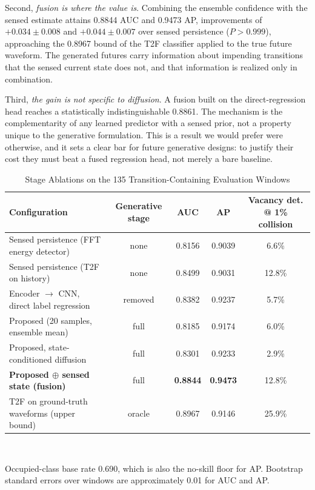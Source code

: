 \documentclass[lettersize,journal]{IEEEtran}
\begin{document}
Second, \emph{fusion is where the value is}. Combining the ensemble
confidence with the sensed estimate attains 0.8844 AUC and 0.9473 AP,
improvements of $+0.034 \pm 0.008$ and $+0.044 \pm 0.007$ over sensed
persistence ($P > 0.999$), approaching the 0.8967 bound of the T2F
classifier applied to the true future waveform. The generated futures
carry information about impending transitions that the sensed current
state does not, and that information is realized only in combination.

Third, \emph{the gain is not specific to diffusion}. A fusion built on
the direct-regression head reaches a statistically indistinguishable
0.8861. The mechanism is the complementarity of any learned predictor
with a sensed prior, not a property unique to the generative
formulation. This is a result we would prefer were otherwise, and it
sets a clear bar for future generative designs: to justify their cost
they must beat a fused regression head, not merely a bare baseline.

\begin{table}[!t]
\centering
\caption{Stage Ablations on the 135 Transition-Containing Evaluation Windows}
\label{tab:ablation}
\renewcommand{\arraystretch}{1.2}
\begin{tabular}{@{}lcccc@{}}
\toprule
\textbf{Configuration} & \textbf{Generative stage} & \textbf{AUC} &
\textbf{AP} & \textbf{Vacancy det. @ 1\% collision} \\
\midrule
Sensed persistence (FFT energy detector)      & none    & 0.8156 & 0.9039 & 6.6\% \\
Sensed persistence (T2F on history)           & none    & 0.8499 & 0.9031 & 12.8\% \\
Encoder $\rightarrow$ CNN, direct label regression & removed & 0.8382 & 0.9237 & 5.7\% \\
Proposed (20 samples, ensemble mean)          & full    & 0.8185 & 0.9174 & 6.0\% \\
Proposed, state-conditioned diffusion         & full    & 0.8301 & 0.9233 & 2.9\% \\
\textbf{Proposed $\oplus$ sensed state (fusion)} & full & \textbf{0.8844} & \textbf{0.9473} & 12.8\% \\
T2F on ground-truth waveforms (upper bound)   & oracle  & 0.8967 & 0.9146 & 25.9\% \\
\bottomrule
\end{tabular}
\\[2pt]
\parbox{0.95\textwidth}{\footnotesize Occupied-class base rate 0.690,
which is also the no-skill floor for AP. Bootstrap standard errors over
windows are approximately 0.01 for AUC and AP.}
\end{table}
\end{document}
